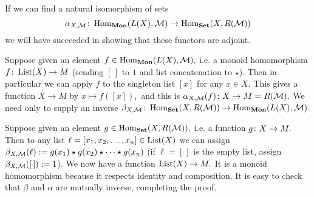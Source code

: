 \documentclass[CT4S-EN-RU]{subfiles}
\begin{document}
\begin{propositionRUS}\label{prop:free forgetful monoid}
\end{propositionRUS}

\begin{proofENG}
If we can find a natural isomorphism of sets 
$$\alpha_{X,\mathcal{M}}\colon\operatorname{Hom}_{\mathbf{Mon}}(L(X),\mathcal{M})\rightarrow\operatorname{Hom}_{\mathbf{Set}}(X,R(\mathcal{M}))$$
we will have succeeded in showing that these functors are adjoint.

Suppose given an element $f\in\operatorname{Hom}_{\mathbf{Mon}}(L(X),\mathcal{M}),$ i.e. a monoid homomorphism $f\colon\operatorname{List}(X)\rightarrow M$ (sending $[\,]$ to $1$ and list concatenation to $\star$). Then in particular we can apply $f$ to the singleton list $[x]$ for any $x\in X.$ This gives a function $X\to M$ by $x\mapsto f([x]),$ and this is $\alpha_{X,\mathcal{M}}(f)\colon X\rightarrow M=R(\mathcal{M}).$ We need only to supply an inverse $\beta_{X,\mathcal{M}}\colon\operatorname{Hom}_{\mathbf{Set}}(X,R(\mathcal{M}))\rightarrow\operatorname{Hom}_{\mathbf{Mon}}(L(X),\mathcal{M}).$

Suppose given an element $g\in\operatorname{Hom}_{\mathbf{Set}}(X,R(\mathcal{M})),$ i.e. a function $g\colon X\rightarrow M.$ Then to any list $\ell=[x_1,x_2,\ldots,x_n]\in\operatorname{List}(X)$ we can assign $\beta_{X,\mathcal{M}}(\ell):=g(x_1)\star g(x_2)\star\cdots\star g(x_n)$ (if $\ell=[\,]$ is the empty list, assign $\beta_{X,\mathcal{M}}([\,]):=1$). We now have a function $\operatorname{List}(X)\rightarrow M.$ It is a monoid homomorphism because it respects identity and composition. It is easy to check that $\beta$ and $\alpha$ are mutually inverse, completing the proof.
\end{proofENG}

\begin{proofRUS}
\end{proofRUS}
\end{document}
